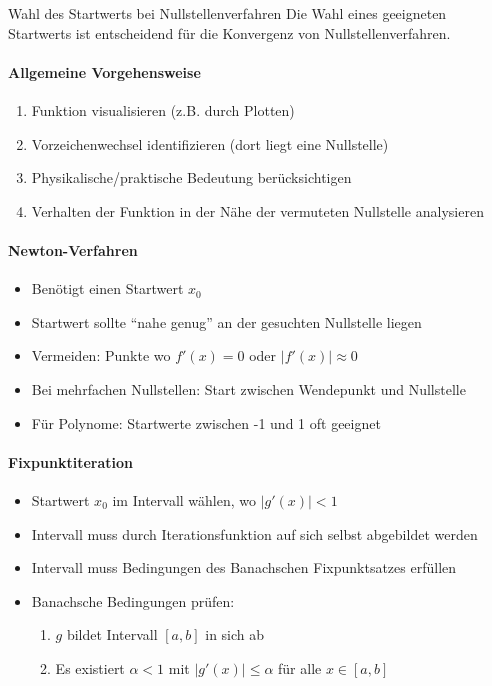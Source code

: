 \begin{KR}{Wahl des Startwerts bei Nullstellenverfahren}
Die Wahl eines geeigneten Startwerts ist entscheidend für die Konvergenz von Nullstellenverfahren.

\paragraph{Allgemeine Vorgehensweise}
\begin{enumerate}
    \item Funktion visualisieren (z.B. durch Plotten)
    \item Vorzeichenwechsel identifizieren (dort liegt eine Nullstelle)
    \item Physikalische/praktische Bedeutung berücksichtigen
    \item Verhalten der Funktion in der Nähe der vermuteten Nullstelle analysieren
\end{enumerate}

\paragraph{Newton-Verfahren}
\begin{itemize}
    \item Benötigt einen Startwert $x_0$ 
    \item Startwert sollte ``nahe genug'' an der gesuchten Nullstelle liegen
    \item Vermeiden: Punkte wo $f'(x) = 0$ oder $|f'(x)| \approx 0$
    \item Bei mehrfachen Nullstellen: Start zwischen Wendepunkt und Nullstelle
    \item Für Polynome: Startwerte zwischen -1 und 1 oft geeignet
\end{itemize}

\paragraph{Fixpunktiteration}
\begin{itemize}
    \item Startwert $x_0$ im Intervall wählen, wo $|g'(x)| < 1$
    \item Intervall muss durch Iterationsfunktion auf sich selbst abgebildet werden
    \item Intervall muss Bedingungen des Banachschen Fixpunktsatzes erfüllen
    \item Banachsche Bedingungen prüfen:
    \begin{enumerate}
        \item $g$ bildet Intervall $[a,b]$ in sich ab
        \item Es existiert $\alpha < 1$ mit $|g'(x)| \leq \alpha$ für alle $x \in [a,b]$
    \end{enumerate}
\end{itemize}


\end{KR}
